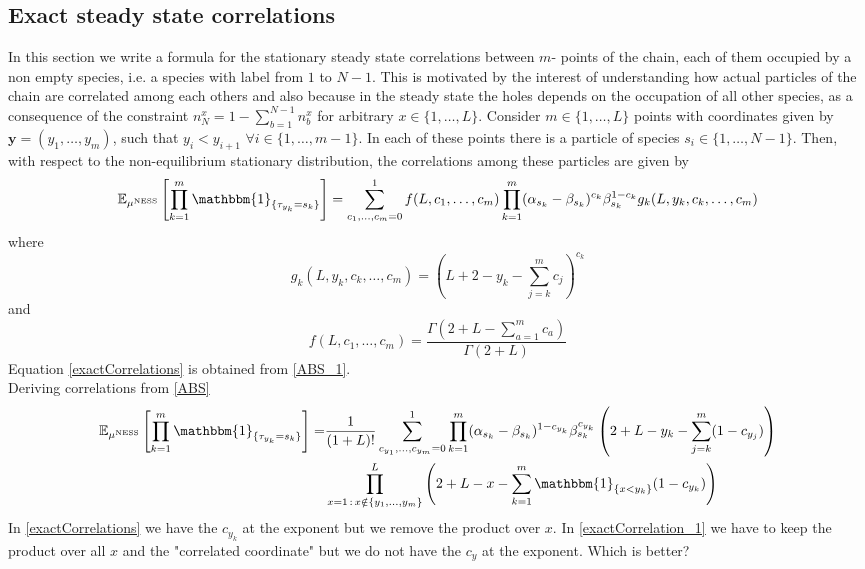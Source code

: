 \documentclass[10pt]{article}
\numberwithin{equation}{section}
\numberwithin{equation}{subsection}
\begin{document}
\subsection{Exact steady state correlations}\label{correlation-section}
In this section we write a formula for the stationary steady state correlations between $m$- points of the chain, each of them occupied by a non empty species, i.e. a species with label from $1$ to $N-1$. This is motivated by the interest of understanding how actual particles of the chain are correlated among each others and also because in the steady state the holes depends on the occupation of all other species, as a consequence of the constraint $n_{N}^{x}=1-\sum_{b=1}^{N-1}n_{b}^{x}$ for arbitrary $x\in \{1,\ldots,L\}$. Consider $m\in \{1,\ldots,L\}$ points with coordinates given by $\bm{y}=(y_{1},\ldots,y_{m})$, such that $y_{i}<y_{i+1}$ $\forall i\in \{1,\ldots,m-1\}$. In each of these points there is a particle of species $s_{i}\in \{1,\ldots,N-1\}$. Then, with respect to the non-equilibrium stationary distribution, the correlations among these particles are given by
\begin{equation}\label{exactCorrelations}
		\mathbb{E}_{\mu^{\text{NESS}}}\left[\prod_{k=1}^{m}\mathbbm{1}_{\{\tau_{y_{k}}=s_{k}\}}\right]=\sum_{c_{1},\ldots,c_{m}=0}^{1}
			f(L,c_{1},\ldots,c_{m})\prod_{k=1}^{m}(\alpha_{s_{k}}-\beta_{s_{k}})^{c_{k}}\beta_{s_{k}}^{1-c_{k}}g_{k}(L,y_{k},c_{k},\ldots,c_{m})
	\end{equation}
	where 
	\begin{equation}\label{powerCoeffSpecies}
		g_{k}(L,y_{k},c_{k},\ldots,c_{m})=\left(L+2-y_{k}-\sum_{j=k}^{m}c_{j}\right)^{c_{k}}
	\end{equation}
	and 
	\begin{equation}\label{powerCoeffNOspec}
		f(L,c_{1},\ldots,c_{m})=\frac{\Gamma(2+L-\sum_{a=1}^{m}c_{a})}{\Gamma(2+L)}
	\end{equation}
{\color{blue}
	Equation \eqref{exactCorrelations} is obtained from \eqref{ABS_1}.\\
	Deriving correlations from \eqref{ABS}
\begin{equation}\label{exactCorrelation_1}
	\begin{split}
\mathbb{E}_{\mu^{\text{NESS}}}\left[\prod_{k=1}^{m}\mathbbm{1}_{\{\tau_{y_{k}}=s_{k}\}}\right]=&\frac{1}{(1+L)!}\sum_{c_{y_{1}},\ldots,c_{y_{m}}=0}^{1}\prod_{k=1}^{m}(\alpha_{s_{k}}-\beta_{s_{k}})^{1-c_{y_{k}}}\beta_{s_{k}}^{c_{y_{k}}}\left(2+L-y_{k}-\sum_{j=k}^{m}(1-c_{y_{j}})\right)\\&\prod_{x=1\,:\,x\notin \{y_{1},\ldots,y_{m}\}}^{L}\left(2+L-x-\sum_{k=1}^{m}\mathbbm{1}_{\{x<y_{k}\}}(1-c_{y_{k}})\right)
\end{split}
\end{equation}
In \eqref{exactCorrelations} we have the $c_{y_{k}}$ at the exponent but we remove the product over $x$.
 In \eqref{exactCorrelation_1} we have to keep the product over all $x$ and the "correlated coordinate" but we do not have the $c_{y}$ at the exponent. Which is better?
\\
}\\
\end{document}
